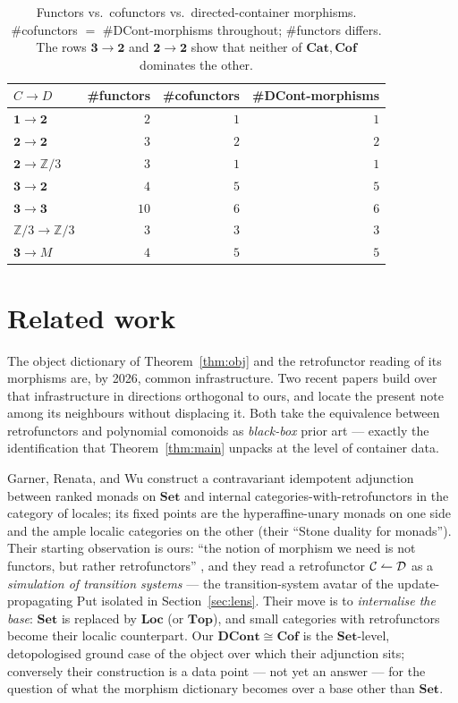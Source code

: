 \documentclass[11pt,a4paper]{amsart}
\newcommand{\Set}{\mathbf{Set}}
\newcommand{\Cat}{\mathbf{Cat}}
\newcommand{\Cof}{\mathbf{Cof}}
\newcommand{\DCont}{\mathbf{DCont}}
\newcommand{\co}{\mathrel{\text{\reflectbox{$\rightharpoonup$}}}}
\theoremstyle{plain}
\theoremstyle{definition}
\theoremstyle{remark}
\begin{document}
\begin{table}[h]\centering
\begin{tabular}{lrrr}
\toprule
$C\to D$ & \#functors & \#cofunctors & \#DCont-morphisms\\
\midrule
$\mathbf 1\to\mathbf 2$ & $2$ & $1$ & $1$\\
$\mathbf 2\to\mathbf 2$ & $3$ & $2$ & $2$\\
$\mathbf 2\to\mathbb Z/3$ & $3$ & $1$ & $1$\\
$\mathbf 3\to\mathbf 2$ & $4$ & $5$ & $5$\\
$\mathbf 3\to\mathbf 3$ & $10$ & $6$ & $6$\\
$\mathbb Z/3\to\mathbb Z/3$ & $3$ & $3$ & $3$\\
$\mathbf 3\to M$ & $4$ & $5$ & $5$\\
\bottomrule
\end{tabular}
\caption{Functors vs.\ cofunctors vs.\ directed-container morphisms.
\#cofunctors $=$ \#DCont-morphisms throughout; \#functors differs. The rows
$\mathbf 3\to\mathbf 2$ and $\mathbf 2\to\mathbf 2$ show that neither of $\Cat,\Cof$
dominates the other.}
\label{tab:counts}
\end{table}

\section{Related work}\label{sec:related}

The object dictionary of Theorem~\ref{thm:obj} and the retrofunctor reading of its morphisms
are, by 2026, common infrastructure. Two recent papers build over that infrastructure in
directions orthogonal to ours, and locate the present note among its neighbours without
displacing it. Both take the equivalence between retrofunctors and polynomial comonoids
\cite{AU16,Clarke20} as \emph{black-box} prior art --- exactly the identification that
Theorem~\ref{thm:main} unpacks at the level of container data.

Garner, Renata, and Wu \cite{GRW26} construct a contravariant idempotent adjunction between
ranked monads on $\Set$ and internal categories-with-retrofunctors in the category of locales;
its fixed points are the hyperaffine-unary monads on one side and the ample localic categories
on the other (their ``Stone duality for monads''). Their starting observation is ours: ``the
notion of morphism we need is not functors, but rather retrofunctors'' \cite[\S1]{GRW26}, and
they read a retrofunctor $\mathcal C\co\mathcal D$ as a \emph{simulation of transition systems}
--- the transition-system avatar of the update-propagating Put isolated in
Section~\ref{sec:lens}. Their move is to \emph{internalise the base}: $\Set$ is replaced by
$\mathbf{Loc}$ (or $\mathbf{Top}$), and small categories with retrofunctors become their localic
counterpart. Our $\DCont\cong\Cof$ is the $\Set$-level, detopologised ground case of the object
over which their adjunction sits; conversely their construction is a data point --- not yet an
answer --- for the question of what the morphism dictionary becomes over a base other than $\Set$.
\end{document}
